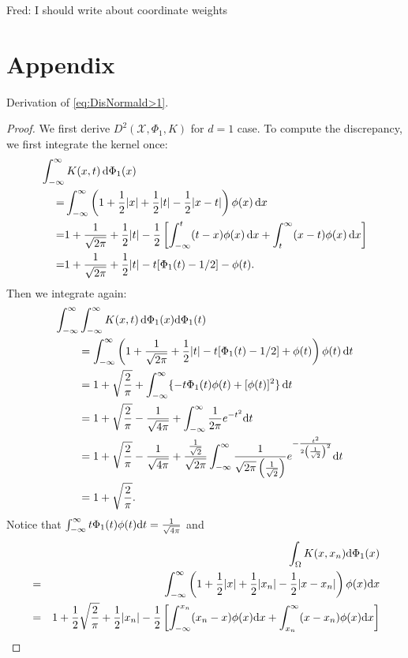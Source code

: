 \documentclass[graybox]{svmult}
\newcommand{\dif}{{\rm d}}
\newcommand{\Xdes}{\mathcal{X}}
\newcommand{\FJH}[1]{{\color{blue}Fred: #1}}
\begin{document}
\FJH{I should write about coordinate weights}


\section*{Appendix}
Derivation of \eqref{eq:DisNormald>1}. 
\begin{proof}
We first derive $D^2(\Xdes,\Phi_1,K)$ for $d=1$ case. 
To compute the discrepancy, we first integrate the kernel once:
\begin{align*}
\MoveEqLeft{\int_{-\infty}^\infty K(x,t) \, \dif \Phi_1(x)}\\
=&\int_{-\infty}^{\infty} \left(1+\frac{1}{2}|x|+\frac{1}{2}|t|-\frac{1}{2}|x-t|\right)\phi(x) \, \dif x\\
=& 1+ \frac{1}{\sqrt{2\pi}} + \frac{1}{2}|t|-\frac{1}{2}\left[\int_{-\infty}^{t}(t-x)\phi(x) \, \dif x+\int_{t}^{\infty} (x-t)\phi(x) \, \dif x\right]\\
=& 1+ \frac{1}{\sqrt{2\pi}} + \frac{1}{2}|t| - t [\Phi_1(t)-1/2] - \phi(t) .
\end{align*}
Then we integrate again:
\begin{align*}
\MoveEqLeft{\int_{-\infty}^\infty \int_{-\infty}^\infty K(x,t) \, \dif \Phi_1(x) \dif \Phi_1(t)}\\
& =  \int_{-\infty}^{\infty} \left( 1+\frac{1}{\sqrt{2\pi}} + \frac{1}{2}|t| - t [\Phi_1(t)-1/2] + \phi(t)\right)\phi(t) \, \dif t\\
&= 1+ \sqrt{\frac{2}{\pi}} + \int_{-\infty}^{\infty} \{ - t \Phi_1(t)\phi(t)  +  [\phi(t)]^2 \} \, \dif t\\
&= 1+\sqrt{\frac{2}{\pi}}-\frac{1}{\sqrt{4\pi}}+\int_{-\infty}^{\infty}\frac{1}{2\pi}e^{-t^2}\dif t\\
&= 1+\sqrt{\frac{2}{\pi}}-\frac{1}{\sqrt{4\pi}}+\frac{\frac{1}{\sqrt{2}}}{\sqrt{2\pi}}\int_{-\infty}^{\infty}\frac{1}{\sqrt{2\pi}\left(\frac{1}{\sqrt{2}}\right)}e^{-\frac{t^2}{2\left(\frac{1}{\sqrt{2}}\right)^2}}\dif t\\
&=1+\sqrt{\frac{2}{\pi}}. 
\end{align*}
Notice that $\int_{-\infty}^{\infty} t\Phi_1(t)\phi(t)\dif t = \frac{1}{\sqrt{4\pi}}$ and 
\begin{eqnarray*}
&&\int_{\Omega}K(x,x_n)\dif \Phi_1(x)\\
&=& \int_{-\infty}^{\infty} \left(1+\frac{1}{2}|x|+\frac{1}{2}|x_n|-\frac{1}{2}|x-x_n|\right)\phi(x)\dif x\\
&=& 1+\frac{1}{2}\sqrt{\frac{2}{\pi}}+\frac{1}{2}|x_n|-\frac{1}{2}\left[\int_{-\infty}^{x_n}(x_n-x)\phi(x)\dif x+\int_{x_n}^{\infty} (x-x_n)\phi(x)\dif x\right]\\

\end{eqnarray*}
\end{proof}
\end{document}
